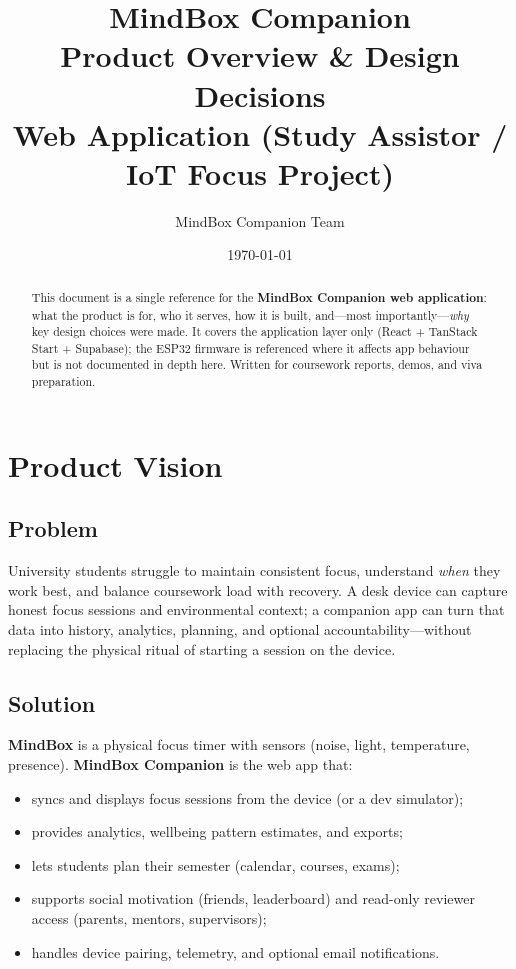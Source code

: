 \documentclass[11pt,a4paper]{article}
\title{\textbf{MindBox Companion}\\[0.5em]
\large Product Overview \& Design Decisions\\[0.3em]
\normalsize Web Application (Study Assistor / IoT Focus Project)}
\author{MindBox Companion Team}
\date{\today}
\begin{document}
\maketitle

\begin{abstract}
This document is a single reference for the \textbf{MindBox Companion web application}:
what the product is for, who it serves, how it is built, and---most importantly---\emph{why}
key design choices were made. It covers the application layer only (React + TanStack Start +
Supabase); the ESP32 firmware is referenced where it affects app behaviour but is not
documented in depth here. Written for coursework reports, demos, and viva preparation.
\end{abstract}

\tableofcontents
\newpage

\section{Product Vision}

\subsection{Problem}

University students struggle to maintain consistent focus, understand \emph{when} they work
best, and balance coursework load with recovery. A desk device can capture honest focus
sessions and environmental context; a companion app can turn that data into history,
analytics, planning, and optional accountability---without replacing the physical ritual of
starting a session on the device.

\subsection{Solution}

\textbf{MindBox} is a physical focus timer with sensors (noise, light, temperature,
presence). \textbf{MindBox Companion} is the web app that:

\begin{itemize}[leftmargin=*]
  \item syncs and displays focus sessions from the device (or a dev simulator);
  \item provides analytics, wellbeing pattern estimates, and exports;
  \item lets students plan their semester (calendar, courses, exams);
  \item supports social motivation (friends, leaderboard) and read-only reviewer access
        (parents, mentors, supervisors);
  \item handles device pairing, telemetry, and optional email notifications.
\end{itemize}
\end{document}

